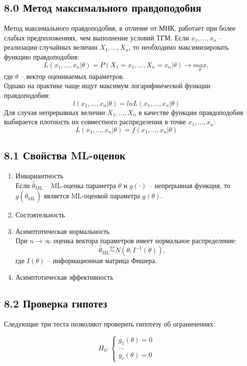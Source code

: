 \documentclass[a0,final]{a0poster}
\begin{document}
\begin{multicols}{4}
\section*{8.0 Метод максимального правдоподобия}
Метод максимального правдоподобия, в отличие от МНК, работает при более слабых предположениях, чем выполнение условий ТГМ. Если $x_1, ..., x_n$ -- реализации случайных величин $X_1, ..., X_n$, то необходимо максимизировать функцию правдоподобия:\\
$$L(x_1, ..., x_n|\theta) = P(X_1=x_1, ..., X_n=x_n|\theta) \rightarrow \underset{\theta}{max},$$
где $\theta$ -- вектор оцениваемых параметров.\\
Однако на практике чаще ищут максимум логарифмической функции правдоподобия:
$$l(x_1, ..., x_n|\theta) = lnL(x_1, ..., x_n|\theta)$$
Для случая непрерывных величин $X_1, ..., X_n$ в качестве функции правдоподобия выбирается плотность их совместного распределения в точке $x_1, ..., x_n$:
$$L(x_1, ..., x_n|\theta) = f(x_1, ..., x_n|\theta)$$
\subsection*{8.1 Свойства ML-оценок}
\begin{enumerate}
\item Инвариантность\\
Если $\hat{\theta}_{\text{ML}}$ -- ML-оценка параметра $\theta$ и $g(\cdot)$ -- непрерывная функция, то $g(\hat{\theta}_{\text{ML}})$ является ML-оценкой параметра $g(\theta)$.
\item Состоятельность
\item Асимптотическая нормальность\\
При $n \rightarrow \infty$ оценка вектора параметров имеет нормальное распределение:
$$\hat{\theta}_{\text{ML}} \overset{as}{\sim} N(\theta; I^{-1}(\theta)),$$
где $I(\theta)$ -- информационная матрица Фишера.
\item Асимптотическая эффективность
\end{enumerate}

\subsection*{8.2 Проверка гипотез}
Следующие три теста позволяют проверить гипотезу об ограничениях:
\setlength{\columnseprule}{0pt}
\begin{multicols}{2}
  \begin{equation*}
    H_0:
\begin{cases}
    g_1(\theta)=0 \\
    ... \\
    g_r(\theta)=0
\end{cases}
  \end{equation*}\break


\end{multicols}
\end{multicols}
\end{document}
